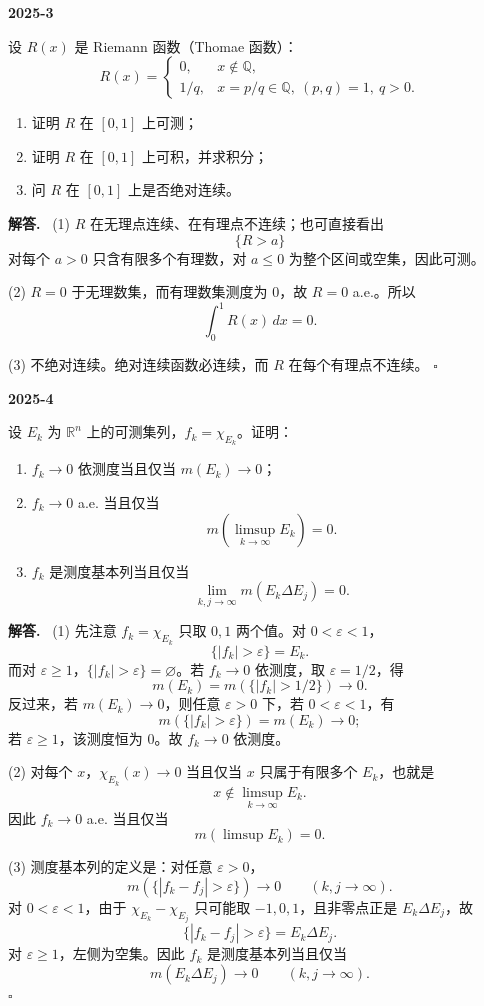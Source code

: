 \documentclass[UTF8]{ctexart}
\newcommand{\R}{\mathbb R}
\newcommand{\Q}{\mathbb Q}
\newcommand{\eps}{\varepsilon}
\newenvironment{problem}[1]{\par\medskip\noindent\textbf{#1}\par\smallskip}{\par}
\newenvironment{solution}{\par\noindent\textbf{解答.}\ }{\hfill$\square$\par\medskip}
\begin{document}
\begin{problem}{2025-3}
设 \(R(x)\) 是 Riemann 函数（Thomae 函数）：
\[
  R(x)=
  \begin{cases}
    0, & x\notin\Q,\\
    1/q, & x=p/q\in\Q,\ (p,q)=1,\ q>0.
  \end{cases}
\]
\begin{enumerate}[label=(\arabic*)]
  \item 证明 \(R\) 在 \([0,1]\) 上可测；
  \item 证明 \(R\) 在 \([0,1]\) 上可积，并求积分；
  \item 问 \(R\) 在 \([0,1]\) 上是否绝对连续。
\end{enumerate}
\end{problem}
\begin{solution}
(1) \(R\) 在无理点连续、在有理点不连续；也可直接看出
\[
  \{R>a\}
\]
对每个 \(a>0\) 只含有限多个有理数，对 \(a\le0\) 为整个区间或空集，因此可测。

(2) \(R=0\) 于无理数集，而有理数集测度为 \(0\)，故 \(R=0\) a.e.。所以
\[
  \int_0^1 R(x)\,dx=0.
\]

(3) 不绝对连续。绝对连续函数必连续，而 \(R\) 在每个有理点不连续。
\end{solution}

\begin{problem}{2025-4}
设 \(E_k\) 为 \(\R^n\) 上的可测集列，\(f_k=\chi_{E_k}\)。证明：
\begin{enumerate}[label=(\arabic*)]
  \item \(f_k\to0\) 依测度当且仅当 \(m(E_k)\to0\)；
  \item \(f_k\to0\) a.e. 当且仅当
  \[
    m(\limsup_{k\to\infty}E_k)=0.
  \]
  \item \(f_k\) 是测度基本列当且仅当
  \[
    \lim_{k,j\to\infty}m(E_k\Delta E_j)=0.
  \]
\end{enumerate}
\end{problem}
\begin{solution}
(1) 先注意 \(f_k=\chi_{E_k}\) 只取 \(0,1\) 两个值。对 \(0<\eps<1\)，
\[
  \{|f_k|>\eps\}=E_k.
\]
而对 \(\eps\ge1\)，\(\{|f_k|>\eps\}=\varnothing\)。若 \(f_k\to0\) 依测度，取
\(\eps=1/2\)，得
\[
  m(E_k)=m(\{|f_k|>1/2\})\to0.
\]
反过来，若 \(m(E_k)\to0\)，则任意 \(\eps>0\) 下，若 \(0<\eps<1\)，有
\[
  m(\{|f_k|>\eps\})=m(E_k)\to0;
\]
若 \(\eps\ge1\)，该测度恒为 \(0\)。故 \(f_k\to0\) 依测度。

(2) 对每个 \(x\)，\(\chi_{E_k}(x)\to0\) 当且仅当 \(x\) 只属于有限多个 \(E_k\)，也就是
\[
  x\notin \limsup_{k\to\infty}E_k.
\]
因此 \(f_k\to0\) a.e. 当且仅当
\[
  m(\limsup E_k)=0.
\]

(3) 测度基本列的定义是：对任意 \(\eps>0\)，
\[
  m(\{|f_k-f_j|>\eps\})\to0\qquad (k,j\to\infty).
\]
对 \(0<\eps<1\)，由于 \(\chi_{E_k}-\chi_{E_j}\) 只可能取 \(-1,0,1\)，且非零点正是
\(E_k\Delta E_j\)，故
\[
  \{|f_k-f_j|>\eps\}=E_k\Delta E_j.
\]
对 \(\eps\ge1\)，左侧为空集。因此 \(f_k\) 是测度基本列当且仅当
\[
  m(E_k\Delta E_j)\to0\qquad (k,j\to\infty).
\]
\end{solution}
\end{document}
